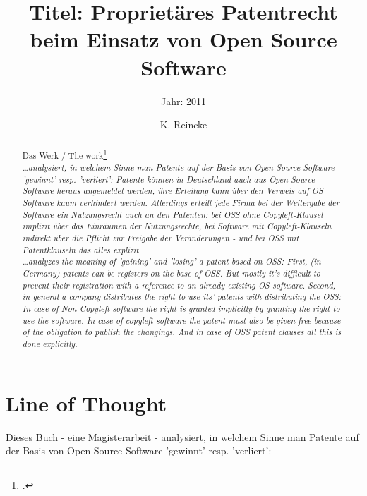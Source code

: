 \documentclass[DIV=calc,BCOR=5mm,11pt,headings=small,oneside,abstract=true, toc=bib]{scrartcl}
\begin{document}

\titlehead{Literaturexzerpt}
\subject{Autor(en): Bernd Suchomski}
\title{Titel: Proprietäres Patentrecht beim Einsatz von Open Source
Software}
\subtitle{Jahr: 2011 }
\author{K. Reincke}

\maketitle

\begin{abstract}
\noindent
Das Werk / The work\footcite[][]{Suchomski2011a} \\
\noindent \itshape
\ldots analysiert, in welchem Sinne man Patente auf der Basis von Open Source
Software 'gewinnt' resp. 'verliert': Patente können in Deutschland auch aus Open
Source Software heraus angemeldet werden, ihre Erteilung kann über den Verweis
auf OS Software kaum verhindert werden. Allerdings erteilt jede Firma bei der
Weitergabe der Software ein Nutzungsrecht auch an den Patenten: bei OSS ohne
Copyleft-Klausel implizit über das Einräumen der Nutzungsrechte, bei Software
mit Copyleft-Klauseln indirekt über die Pflicht zur Freigabe der Veränderungen -
und bei OSS mit Patentklauseln das alles explizit.
\\
\noindent
\ldots analyzes the meaning of 'gaining' and 'losing' a patent based on OSS:
First, (in Germany) patents can be registers on the base of OSS. But mostly
it's difficult to prevent their registration with a reference to an already
existing OS software. Second, in general a company distributes the right to use
its' patents with distributing the OSS: In case of Non-Copyleft software the
right is granted implicitly by granting the right to use the software. In case
of copyleft software the patent must also be given free because of the
obligation to publish the changings. And in case of OSS patent clauses all this
is done
explicitly.
\end{abstract}
\footnotesize
\normalsize

\section{Line of Thought}

Dieses Buch - eine Magisterarbeit - analysiert, in welchem Sinne man Patente auf
der Basis von Open Source Software 'gewinnt' resp. 'verliert':
\end{document}
